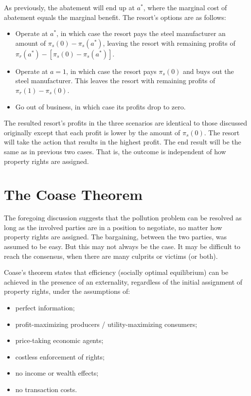 \documentclass[
]{book}
\providecommand{\tightlist}{%
  \setlength{\itemsep}{0pt}\setlength{\parskip}{0pt}}
\begin{document}
As previously, the abatement will end up at \(a^*\), where the marginal cost of abatement equals the marginal benefit. The resort's options are as follows:

\begin{itemize}
\tightlist
\item
  Operate at \(a^*\), in which case the resort pays the steel manufacturer an amount of \(\pi_s(0)-\pi_s(a^*)\), leaving the resort with remaining profits of \(\pi_r(a^*)-[\pi_s(0)-\pi_s(a^*)]\).
\item
  Operate at \(a=1\), in which case the resort pays \(\pi_s(0)\) and buys out the steel manufacturer. This leaves the resort with remaining profits of \(\pi_r(1)-\pi_s(0)\).
\item
  Go out of business, in which case its profits drop to zero.
\end{itemize}

The resulted resort's profits in the three scenarios are identical to those discussed originally except that each profit is lower by the amount of \(\pi_s(0)\). The resort will take the action that results in the highest profit. The end result will be the same as in previous two cases. That is, the outcome is independent of how property rights are assigned.

\hypertarget{the-coase-theorem}{%
\section{The Coase Theorem}\label{the-coase-theorem}}

The foregoing discussion suggests that the pollution problem can be resolved as long as the involved parties are in a position to negotiate, no matter how property rights are assigned. The bargaining, between the two parties, was assumed to be easy. But this may not always be the case. It may be difficult to reach the consensus, when there are many culprits or victims (or both).

Coase's theorem states that efficiency (socially optimal equilibrium) can be achieved in the presence of an externality, regardless of the initial assignment of property rights, under the assumptions of:

\begin{itemize}
\tightlist
\item
  perfect information;
\item
  profit-maximizing producers / utility-maximizing consumers;
\item
  price-taking economic agents;
\item
  costless enforcement of rights;
\item
  no income or wealth effects;
\item
  no transaction costs.
\end{itemize}
\end{document}
